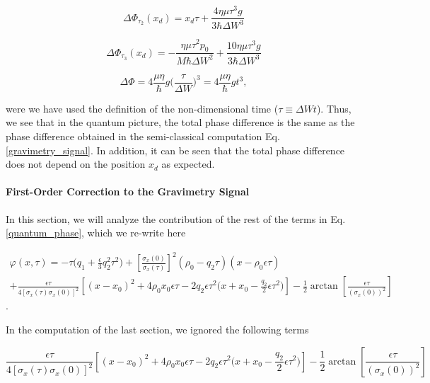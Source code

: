 \documentclass{article}
\begin{document}
\begin{equation}
\Delta \Phi_{\tau_{2}}(x_{d}) = x_{d}\tau + \frac{4 \eta \mu \tau^{3} g}{3 \hbar \Delta W^{3}}
\end{equation}

\begin{equation}
\Delta \Phi_{\tau_{3}}(x_{d}) = -\frac{\eta \mu \tau^{2} p_{0}}{M \hbar \Delta W^{2}} + \frac{10 \eta \mu \tau^{3} g}{3 \hbar \Delta W^{3}}
\end{equation}

\begin{equation}\label{quantum_gravimetry_signal}
\Delta \Phi = 4 \frac{\mu \eta }{\hbar} g \bigg(\frac{\tau}{\Delta W}\bigg)^{3} = 4 \frac{\mu \eta }{\hbar} g t^{3},
\end{equation}

were we have used the definition of the non-dimensional time ($\tau\equiv \Delta W t$). Thus, we see that in the quantum picture, the total phase difference is the same as the phase difference obtained in the semi-classical computation Eq. \ref{gravimetry_signal}. In addition, it can be seen that the total phase difference does not depend on the position $x_{d}$ as expected.

\paragraph{First-Order Correction to the Gravimetry Signal}
In this section, we will analyze the contribution of the rest of the terms in Eq. \ref{quantum_phase}, which we re-write here

\begin{multline*}\label{quantum_phase_revisited}
\varphi(x, \tau) = -\tau \bigg(q_{1} + \frac{\epsilon}{3} q_{2}^{2} \tau^{2}\bigg) + \left[\frac{\sigma_{x}(0)}{\sigma_{x}(\tau)} \right]^{2} (\rho_{0} - q_{2} \tau)(x-\rho_{0} \epsilon \tau) \\
+ \frac{\epsilon \tau}{4 [\sigma_{x}(\tau)\sigma_{x}(0)]^{2}} \left[(x-x_{0})^{2} + 4\rho_{0} x_{0} \epsilon \tau -2q_{2} \epsilon \tau^{2} \bigg(x+x_{0}- \frac{q_{2}}{2} \epsilon \tau^{2} \bigg)\right] 
- \frac{1}{2}\arctan\left[\frac{\epsilon \tau}{(\sigma_{x}(0))^{2}}\right]
\end{multline*}.

In the computation of the last section, we ignored the following terms

\begin{equation*}
\frac{\epsilon \tau}{4 [\sigma_{x}(\tau)\sigma_{x}(0)]^{2}} \left[(x-x_{0})^{2} + 4\rho_{0} x_{0} \epsilon \tau -2q_{2} \epsilon \tau^{2} \bigg(x+x_{0}- \frac{q_{2}}{2} \epsilon \tau^{2} \bigg)\right] 
- \frac{1}{2}\arctan\left[\frac{\epsilon \tau}{(\sigma_{x}(0))^{2}}\right]
\end{equation*}
\end{document}
